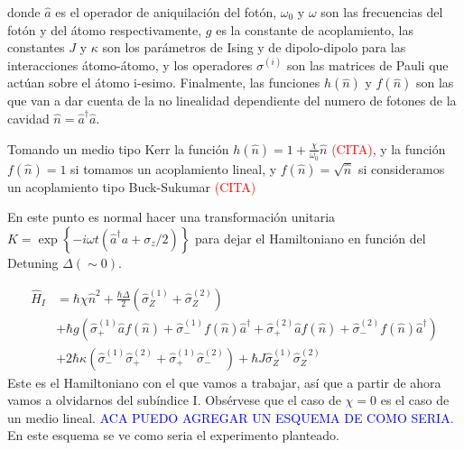 donde $\hat a$ es el operador de aniquilaci\'on del fot\'on, $\omega_0$ y $\omega$ son las frecuencias del fot\'on y del átomo respectivamente, $g$ es la constante de acoplamiento, las constantes $J$ y $\kappa$ son los par\'ametros de Ising y de dipolo-dipolo para las interacciones átomo-átomo, y los operadores $\sigma^{(i)}$ son las matrices de Pauli que act\'uan sobre el átomo i-esimo. Finalmente, las funciones $h(\hat n)$ y $f(\hat n)$ son las que van a dar cuenta de la no linealidad dependiente del numero de fotones de la cavidad $\hat n = \hat a^\dagger \hat a$. 

Tomando un medio tipo Kerr la funci\'on $h(\hat n)=1+\frac{\chi}{\omega_0}\hat n$ \cite{}\textcolor{red}{(CITA)}, y la funci\'on $f(\hat n) =1$ si tomamos un acoplamiento lineal, y $f(\hat n) = \sqrt{\hat n}$ si consideramos un acoplamiento tipo Buck-Sukumar \cite{}\textcolor{red}{(CITA)}

En este punto es normal hacer una transformaci\'on unitaria  $K = \exp\left\{-i \omega t (\hat a^\dagger a + \sigma_z/2)\right\}$ para dejar el Hamiltoniano en funci\'on del Detuning $\Delta (\sim 0)$. 

\begin{equation}
\begin{split}
     \hat H_I & =\hbar \chi \hat n^2+\frac{\hbar \Delta}{2}(\hat\sigma_Z^{(1)}+\hat\sigma_Z^{(2)})   \\ 
     & + \hbar g(\hat\sigma_+^{(1)}\hat a f(\hat n)+\hat\sigma_-^{(1)}f(\hat n) \hat a^\dagger + \hat\sigma_+^{(2)}\hat a f(\hat n)+\hat\sigma_-^{(2)}f(\hat n) \hat a^\dagger) \\ 
 & + 2\hbar \kappa (\hat \sigma_-^{(1)}\hat \sigma_+^{(2)}+\hat \sigma_+^{(1)}\hat \sigma_-^{(2)}) + \hbar J \hat \sigma_Z^{(1)}\hat \sigma_Z^{(2)}
\end{split}
\end{equation}\label{eq4:H}
Este es el Hamiltoniano con el que vamos a trabajar, así que a partir de ahora vamos a olvidarnos del subíndice I. Obsérvese que el caso de $\chi=0$ es el caso de un medio lineal. 
\textcolor{blue}{ACA PUEDO AGREGAR UN ESQUEMA DE COMO SERIA.} En este esquema se ve como seria el experimento planteado. 

